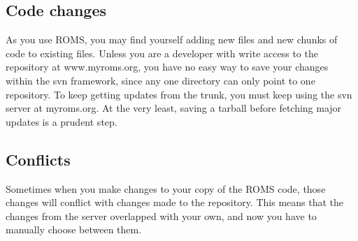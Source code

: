\subsection{Code changes}
As you use ROMS, you may find yourself adding new files and new chunks of
code to existing files. Unless you are a developer with write access to the
repository at www.myroms.org, you have no easy way to save your changes
within the svn framework, since any one directory can only point to one
repository. To keep getting updates from the trunk, you must keep using the
svn server at myroms.org. At the very least, saving a tarball before
fetching major updates is a prudent step.

\subsection{Conflicts}
Sometimes when you make changes to your copy of the ROMS code, those changes
will conflict with changes made to the repository. This means that the
changes from the server overlapped with your own, and now you have to
manually choose between them.

